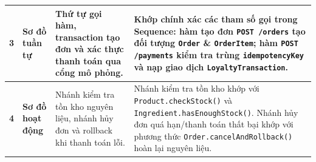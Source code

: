 \documentclass[12pt,a4paper]{article}
\begin{document}
\begin{xltabular}{\textwidth}{|c|>{\raggedright\arraybackslash}p{3.8cm}|>{\raggedright\arraybackslash}p{3.8cm}|>{\raggedright\arraybackslash}X|}
\textbf{3} & \textbf{Sơ đồ tuần tự}\newline{} & Thứ tự gọi hàm, transaction tạo đơn và xác thực thanh toán qua cổng mô phỏng. & 
Khớp chính xác các tham số gọi trong Sequence: hàm tạo đơn \texttt{POST /orders} tạo đối tượng \texttt{Order} \& \texttt{OrderItem}; hàm \texttt{POST /payments} kiểm tra trùng \texttt{idempotencyKey} và nạp giao dịch \texttt{LoyaltyTransaction}. \\
\hline

\textbf{4} & \textbf{Sơ đồ hoạt động}\newline{} & Nhánh kiểm tra tồn kho nguyên liệu, nhánh hủy đơn và rollback khi thanh toán lỗi. & 
Nhánh kiểm tra tồn kho khớp với \texttt{Product.checkStock()} và \texttt{Ingredient.hasEnoughStock()}.\newline
Nhánh hủy đơn quá hạn/thanh toán thất bại khớp với phương thức \texttt{Order.cancelAndRollback()} hoàn lại nguyên liệu. \\
\hline
\end{xltabular}
\end{document}
